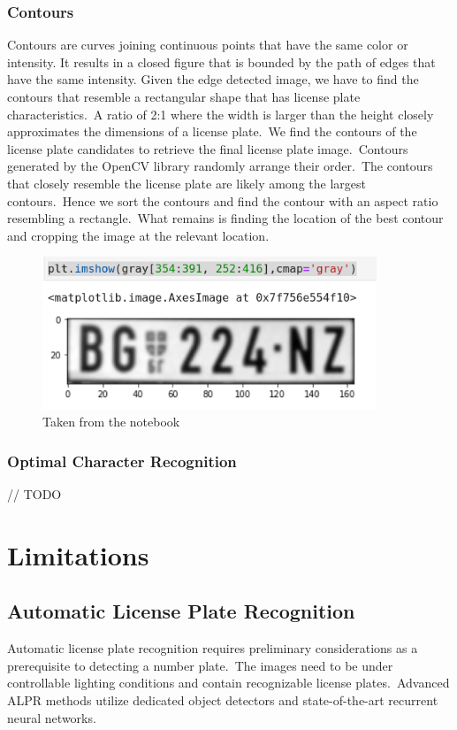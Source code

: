\documentclass[a4paper,twoside,10pt]{report}
\begin{document}
\subsection{Contours}
Contours are curves joining continuous points that have the same color or intensity. It results in a closed figure that is bounded by the path of edges that have the same intensity.
Given the edge detected image, we have to find the contours that resemble a rectangular shape that has license plate characteristics.\ 
A ratio of 2:1 where the width is larger than the height closely approximates the dimensions of a license plate.\ 
We find the contours of the license plate candidates to retrieve the final license plate image.\ 
Contours generated by the OpenCV library randomly arrange their order.\ 
The contours that closely resemble the license plate are likely among the largest contours.\ 
Hence we sort the contours and find the contour with an aspect ratio resembling a rectangle.\ 
What remains is finding the location of the best contour and cropping the image at the relevant location. 
\begin{center}
  \begin{figure}[h!]
    \includegraphics[width=10cm]{images/result.png}
    \caption{Taken from the notebook}
  \end{figure}
\end{center}
\subsection{Optimal Character Recognition}
 // TODO 

\chapter{Limitations}
\section{Automatic License Plate Recognition}
Automatic license plate recognition requires preliminary considerations as a prerequisite to detecting a number plate.\ 
The images need to be under controllable lighting conditions and contain recognizable license plates.\ 
Advanced ALPR methods utilize dedicated object detectors and state-of-the-art recurrent neural networks.\\ [4pt]
\end{document}

